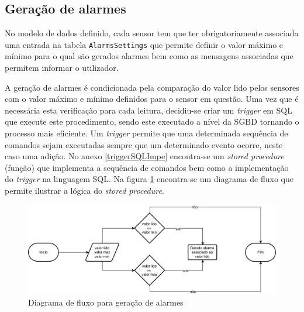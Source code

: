 \subsection{Geração de alarmes}

No modelo de dados definido, cada sensor tem que ter obrigatoriamente associada uma entrada na tabela \texttt{AlarmsSettings} que permite definir o valor máximo e mínimo para o qual são gerados alarmes bem como as mensagens associadas que permitem informar o utilizador. 

A geração de alarmes é condicionada pela comparação do valor lido pelos sensores com o valor máximo e mínimo definidos para o sensor em questão. Uma vez que é necessária esta verificação para cada leitura, decidiu-se criar um \textit{trigger} em \ac{SQL} que execute este procedimento, sendo este executado a nível da \ac{SGBD} tornando o processo mais eficiente. Um \textit{trigger} permite que uma determinada sequência de comandos sejam executadas sempre que um determinado evento ocorre, neste caso uma adição. No anexo \ref{triggerSQLImpe} encontra-se um \textit{stored procedure} (função) que implementa a sequência de comandos bem como a implementação do \textit{trigger} na linguagem \ac{SQL}. Na figura \ref{fluxoSP} encontra-se um diagrama de fluxo que permite ilustrar a lógica do \textit{stored procedure}. 



\begin{figure}[!htb]
	\centering
	\includegraphics[scale=0.5]{esquemas/diagramafluxoalarms.pdf}
	\caption{Diagrama de fluxo para geração de alarmes}
	\label{fluxoSP}
\end{figure}






